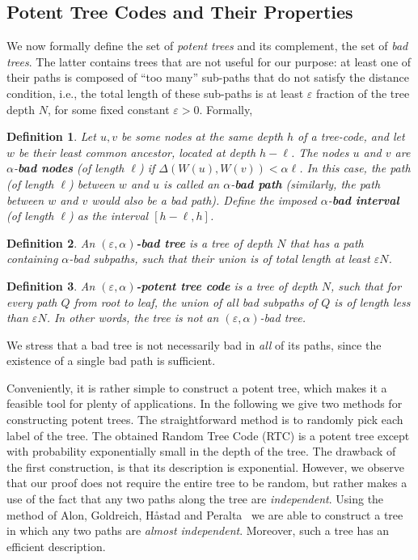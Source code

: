 \documentclass[ letterpaper, 11pt]{article}
\newtheorem{definition}{Definition}
\newcommand{\eps}{\varepsilon}
\newcommand{\potent}{potent\xspace}
\newcommand{\RTBC}{\textsf{RTC}\xspace}
\begin{document}
\subsection{Potent Tree Codes and Their Properties}\label{sec:potent}


We now formally define the set of \emph{\potent trees} and its complement,
the set of \emph{bad trees}. The latter contains trees that are not useful for our purpose:
at least one of their paths is composed of
``too many'' sub-paths that do not satisfy the distance condition, i.e.,
the total length of these sub-paths
is at least $\varepsilon$ fraction of the tree depth $N$, for some fixed constant $\varepsilon>0$. Formally,
\begin{definition}\label{def:badNode}
Let $u,v$ be some nodes at the same depth $h$ of a tree-code, and let
$w$ be their least common ancestor, located at depth $h-\ell$.
The nodes $u$ and $v$ are
$\alpha$-\textbf{bad nodes} (of length $\ell$)
if $\Delta(W(u),W(v)) < \alpha\ell$.
In this case, the path (of length $\ell$) between $w$ and $u$ is called an $\alpha$-\textbf{bad path} (similarly, the path between $w$ and $v$ would also be a bad path).
Define the imposed $\alpha$-\textbf{bad interval} (of length $\ell$)
as the interval $[h-\ell, h]$.
\end{definition}



\begin{definition}\label{def:badTree}
An \textbf{$(\varepsilon,\alpha)$-bad tree}
is a tree of depth $N$
that has a path containing $\alpha$-bad subpaths, such that their
union is of total length at least $\varepsilon N$.
\end{definition}
\begin{definition}
An  \textbf{$(\eps,\alpha)$-\potent tree code}  is a tree of depth $N$,
such that for every path $Q$ from root to leaf,
the union of all bad subpaths of $Q$ is of length less than $\eps N$.
In other words,  the tree is \emph{not} an $(\eps,\alpha)$-bad tree.
\end{definition}
\noindent We stress that a bad tree is not necessarily bad in \emph{all} of its paths,
since the existence of a single bad path is sufficient.

Conveniently, it is rather simple to construct a \potent tree,
which makes it a feasible
tool for plenty of applications.
In the following we give two methods for constructing \potent trees.
The straightforward method is to randomly pick each label of the tree.
The obtained Random Tree Code (\RTBC) is a potent tree except with probability
exponentially small in the depth of the tree.
The drawback of the first construction, is that its description is exponential.
However, we observe that our proof does not require the entire tree to be random,
but rather makes a use of the fact that any two paths along the tree are \emph{independent}.
Using the method of Alon, Goldreich, H{\aa}stad and Peralta~\cite{AGHP92}
we are able to construct a  tree in which any two paths are \emph{almost independent}.
Moreover, such a tree has an efficient description.
\end{document}
